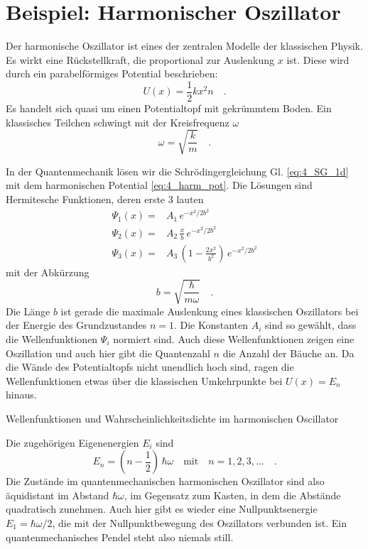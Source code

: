 \section{Beispiel: Harmonischer Oszillator}

Der harmonische Oszillator ist eines der zentralen Modelle der klassischen Physik. Es wirkt eine Rückstellkraft, die proportional zur Auslenkung $x$ ist. Diese wird durch ein parabelförmiges Potential beschrieben:
\begin{equation}
    U(x) = \frac{1}{2} k x^2n\quad .
    \label{eq:4_harm_pot}
\end{equation}
Es handelt sich quasi um einen Potentialtopf mit gekrümmtem Boden.
Ein klassisches Teilchen schwingt mit der Kreisfrequenz $\omega$
\begin{equation}
    \omega = \sqrt{\frac{k}{m}} \quad .
\end{equation}

In der Quantenmechanik lösen wir die Schrödingergleichung Gl. \ref{eq:4_SG_1d} mit dem harmonischen Potential \ref{eq:4_harm_pot}. Die Lösungen sind Hermitesche Funktionen, deren erste 3 lauten
\begin{align}
    \Psi_1(x) = & A_1 \, e^{-x^2 / 2 b^2} \\
    \Psi_2(x) = & A_2 \, \frac{x}{b} \, e^{-x^2 / 2 b^2} \\
    \Psi_3(x) = & A_3 \, \left(1- \frac{2x^2}{b^2} \right) \, e^{-x^2 / 2 b^2} 
\end{align}
mit der Abkürzung 
\begin{equation}
    b = \sqrt{\frac{\hbar}{m \omega}} \quad .
\end{equation}
Die Länge $b$ ist gerade die maximale Auslenkung eines klassischen Oszillators bei der Energie des Grundzustandes $n=1$. Die Konstanten $A_i$ sind so gewählt, dass die Wellenfunktionen $\Psi_i$ normiert sind. Auch diese Wellenfunktionen zeigen eine Oszillation und auch hier gibt die Quantenzahl $n$ die Anzahl der Bäuche an. Da die Wände des Potentialtopfs nicht unendlich hoch sind, ragen die Wellenfunktionen etwas über die klassischen Umkehrpunkte bei $U(x) = E_n$ hinaus.

\begin{marginfigure}
    \caption{Wellenfunktionen und Wahrscheinlichkeitsdichte im harmonischen Oscillator}
\end{marginfigure}

Die zugehörigen Eigenenergien $E_i$ sind
\begin{equation}
    E_n = \left( n - \frac{1}{2}\right) \, \hbar \omega \quad \text{mit} \quad n = 1, 2, 3, \dots \quad .
\end{equation}
Die Zustände im quantenmechanischen harmonischen Oszillator sind also äquidistant im Abstand $\hbar\omega$, im Gegensatz zum Kasten, in dem die Abstände quadratisch zunehmen. Auch hier gibt es wieder eine Nullpunktsenergie $E_1 = \hbar\omega/2$, die mit der Nullpunktbewegung des Oszillators verbunden ist. Ein quantenmechanisches Pendel steht also niemals still.

